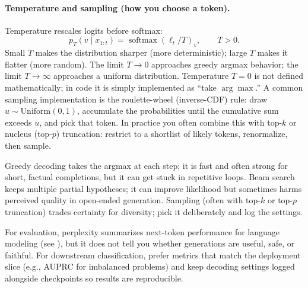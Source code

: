 \paragraph{Temperature and sampling (how you choose a token).}
Temperature rescales logits before softmax:
\begin{equation}
    p_T(v\mid x_{1:t}) = \operatorname{softmax}\!\left(\boldsymbol{\ell}_t/T\right)_v, \qquad T>0.
    \label{eq:transformers_temperature_softmax}
\end{equation}
Small \(T\) makes the distribution sharper (more deterministic); large \(T\) makes it flatter (more random). The limit \(T\to 0\) approaches greedy argmax behavior; the limit \(T\to\infty\) approaches a uniform distribution. Temperature \(T=0\) is not defined mathematically; in code it is simply implemented as ``take \(\arg\max\).'' A common sampling implementation is the roulette-wheel (inverse-CDF) rule: draw \(u\sim \mathrm{Uniform}(0,1)\), accumulate the probabilities until the cumulative sum exceeds \(u\), and pick that token. In practice you often combine this with top-\(k\) or nucleus (top-\(p\)) truncation: restrict to a shortlist of likely tokens, renormalize, then sample.

Greedy decoding takes the argmax at each step; it is fast and often strong for short, factual completions, but it can get stuck in repetitive loops. Beam search keeps multiple partial hypotheses; it can improve likelihood but sometimes harms perceived quality in open-ended generation. Sampling (often with top-\(k\) or top-\(p\) truncation) trades certainty for diversity; pick it deliberately and log the settings.

For evaluation, perplexity summarizes next-token performance for language modeling (see ), but it does not tell you whether generations are useful, safe, or faithful. For downstream classification, prefer metrics that match the deployment slice (e.g., AUPRC for imbalanced problems) and keep decoding settings logged alongside checkpoints so results are reproducible.

